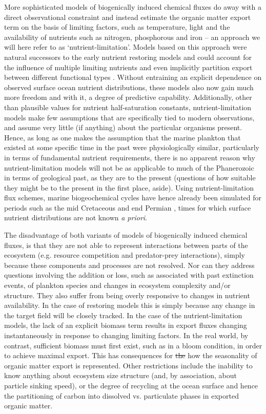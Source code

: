 \documentclass[gmd, manuscript]{copernicus}
\providecommand{\DIFdel}[1]{{\protect\color{red}\sout{#1}}}                      %
\providecommand{\DIFdelbegin}{} %
\providecommand{\DIFdelend}{} %
\begin{document}
More sophisticated models of biogenically induced chemical fluxes do away with a direct observational constraint and instead estimate the organic matter export term on the basis of limiting factors, such as temperature, light and the availability of nutrients such as nitrogen, phosphorous and iron -- an approach we will here refer to as `nutrient-limitation'. Models based on this approach \citep[e.g.][]{Bacastow:1990, Heinze:1991, Archer:2000} were natural successors to the early nutrient restoring models and could account for the influence of multiple limiting nutrients and even implicitly partition export between different functional types \citep{Watson:2000}. Without entraining an explicit dependence on observed surface ocean nutrient distributions, these models also now gain much more freedom and with it, a degree of predictive capability. Additionally, other than plausible values for nutrient half-saturation constants, nutrient-limitation models make few assumptions that are specifically tied to modern observations, and assume very little (if anything) about the particular organisms present. Hence, as long as one makes the assumption that the marine plankton that existed at some specific time in the past were physiologically similar, particularly in terms of fundamental nutrient requirements, there is no apparent reason why nutrient-limitation models will not be as applicable to much of the Phanerozoic in terms of geological past, as they are to the present (questions of how suitable they might be to the present in the first place, aside). Using nutrient-limitation flux schemes, marine biogeochemical cycles have hence already been simulated for periods such as the mid Cretaceous \citep{Monteiro:2012} and end Permian \citep{Meyer:2008}, times for which surface nutrient distributions are not known \textit{a priori}.

The disadvantage of both  variants  of models of biogenically induced chemical fluxes, is that they are not able to represent interactions between parts of the ecosystem (e.g. resource competition and predator-prey interactions), simply because these components and processes are not resolved. Nor can they address questions involving the addition or loss, such as associated with past extinction events, of plankton species and changes in ecosystem complexity and/or structure. They also suffer from being overly responsive to changes in nutrient availability. In the case of restoring models this is simply because any change in the target field will be closely tracked. In the case of the nutrient-limitation models, the lack of an explicit biomass term results in export fluxes  changing instantaneously in response to changing limiting factors. In the real world, by contrast, sufficient biomass must first exist, such as in a bloom condition, in order to achieve maximal export. This has consequences for \DIFdelbegin \DIFdel{the }\DIFdelend how the seasonality of organic matter  export  is represented. Other restrictions include the inability to know anything about ecosystem size structure (and, by association, about particle sinking speed), or the degree of recycling at the ocean surface and hence the partitioning of carbon into dissolved vs. particulate phases in exported organic matter. 
\end{document}
